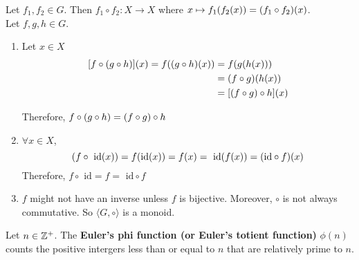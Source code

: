 \begin{solution}
    Let $f_1, f_2 \in G$. Then $f_1 \circ f_2: X \to X$ where $x \mapsto f_1\qty(f_2\qty(x)) = \qty(f_1 \circ f_2)(x)$. \\
    Let $f, g, h \in G$.
    \begin{myspace}
        \begin{enumerate}[label=\textbf{(G\arabic*)}]
            \item Let $x \in X$
            \begin{align*}
                \qty[f \circ \qty(g \circ h)] \qty(x) = f\qty(\qty(g \circ h)\qty(x)) &= f\qty(g\qty(h(x))) \\
                &= \qty(f \circ g)\qty(h(x)) \\
                &= \qty[\qty(f \circ g) \circ h]\qty(x)
            \end{align*}
            
            Therefore, $f \circ \qty(g \circ h) = \qty(f \circ g) \circ h$
            \item $\forall x \in X$, 
            \[ \qty(f \circ \text{ id}(x)) = f\qty(\text{id}(x)) = f(x) = \text{ id}(f(x)) = \qty(\text{id} \circ f)(x) \]
            Therefore, $f \circ \text{ id} = f = \text{ id} \circ f$
            \item $f$ might not have an inverse unless $f$ is bijective. Moreover, $\circ$ is not always commutative. So $\langle G, \circ \rangle$ is a monoid. 
        \end{enumerate}
    \end{myspace}
\end{solution}

\begin{definition}
    Let $n \in \mathbb{Z}^+$. The \textbf{Euler's phi function (or Euler's totient function)} $\phi(n)$ counts the positive intergers less than or equal to $n$ that are relatively prime to $n$. 
\end{definition}

